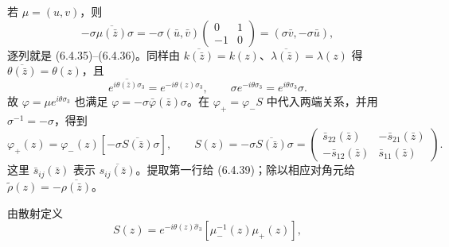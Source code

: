 \documentclass[lang=cn,scheme=chinese,mode=simple,device=normal,color=blue,
math=cm,thmcnt=section,12pt]{elegantbook}
\newcommand{\eqq}[2]{\tag{#1}\label{eq:#1}#2}
\begin{document}
\begin{callout}[计算：从整矩阵共轭关系到两列及散射系数]
    若 $\mu=(u,v)$，则
    \[
        -\sigma\overline{\mu(\bar z)}\sigma
        =-\sigma(\bar u,\bar v)\begin{pmatrix}0&1\\-1&0\end{pmatrix}
        =(\sigma\bar v,-\sigma\bar u),
    \]
    逐列就是 (6.4.35)–(6.4.36)。同样由 $\overline{k(\bar z)}=k(z)$、$\overline{\lambda(\bar z)}=\lambda(z)$ 得 $\overline{\theta(\bar z)}=\theta(z)$，且
    \[
        \overline{e^{i\theta(\bar z)\sigma_3}}=e^{-i\theta(z)\sigma_3},\qquad
        \sigma e^{-i\theta\sigma_3}=e^{i\theta\sigma_3}\sigma.
    \]
    故 $\varphi=\mu e^{i\theta\sigma_3}$ 也满足 $\varphi=-\sigma\bar\varphi(\bar z)\sigma$。在 $\varphi_+=\varphi_-S$ 中代入两端关系，并用 $\sigma^{-1}=-\sigma$，得到
    \[
        \varphi_+(z)=\varphi_-(z)[-\sigma\overline{S(\bar z)}\sigma],\qquad
        S(z)=-\sigma\overline{S(\bar z)}\sigma
        =\begin{pmatrix}\bar s_{22}(\bar z)&-\bar s_{21}(\bar z)\\-\bar s_{12}(\bar z)&\bar s_{11}(\bar z)\end{pmatrix}.
    \]
    这里 $\bar s_{ij}(\bar z)$ 表示 $\overline{s_{ij}(\bar z)}$。提取第一行给 (6.4.39)；除以相应对角元给 $\widetilde\rho(z)=-\overline{\rho(\bar z)}$。
\end{callout}





由散射定义
\begin{equation}\eqq{6.4.47}{S(z)=e^{-i\theta(z)\widehat\sigma_3}[\mu_-^{-1}(z)\mu_+(z)],}\end{equation}
\end{document}
